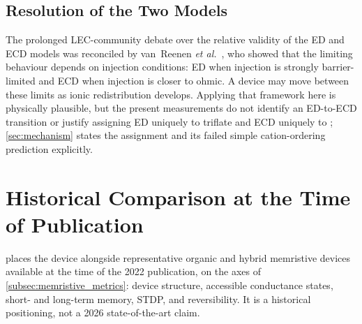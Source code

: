 \subsection{Resolution of the Two Models}

The prolonged LEC-community debate over the relative validity of the ED and ECD models was reconciled by van~Reenen \textit{et al.}~\cite{vanReenen2010}, who showed that the limiting behaviour depends on injection conditions: ED when injection is strongly barrier-limited and ECD when injection is closer to ohmic. A device may move between these limits as ionic redistribution develops. Applying that framework here is physically plausible, but the present measurements do not identify an ED-to-ECD transition or justify assigning ED uniquely to triflate and ECD uniquely to ; \cref{sec:mechanism} states the assignment and its failed simple cation-ordering prediction explicitly.

\section{Historical Comparison at the Time of Publication}\label{app:ch2_comparison}

 places the device alongside representative organic and hybrid memristive devices available at the time of the 2022 publication, on the axes of \cref{subsec:memristive_metrics}: device structure, accessible conductance states, short- and long-term memory, STDP, and reversibility. It is a historical positioning, not a 2026 state-of-the-art claim.

